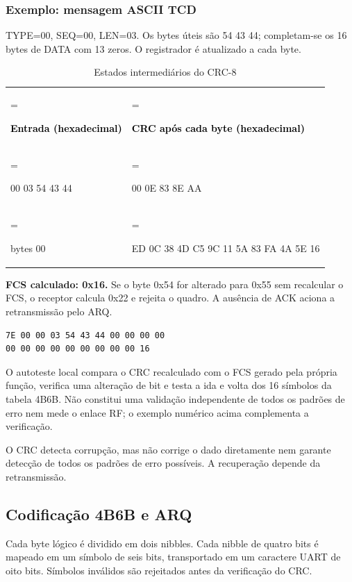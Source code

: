 \subsubsection*{Exemplo: mensagem ASCII TCD}
TYPE=00, SEQ=00, LEN=03. Os bytes úteis são 54 43 44; completam-se os 16 bytes de DATA com 13 zeros. O registrador é atualizado a cada byte.

\begin{table}[H]\centering\small\caption{Estados intermediários do CRC-8}\label{tab:9}
\begin{tabularx}{\linewidth}{>{\hsize=0.7423\hsize\linewidth=\hsize\raggedright\arraybackslash}X>{\hsize=1.2577\hsize\linewidth=\hsize\raggedright\arraybackslash}X}
\rowcolor{tcdtablehead} \textcolor{black}{\textbf{Entrada (hexadecimal)}} & \textcolor{black}{\textbf{CRC após cada byte (hexadecimal)}} \\
00 00 03 54 43 44 & 00 00 0E 83 8E AA \\
13 bytes 00 & ED 0C 38 4D C5 9C 11 5A 83 FA 4A 5E 16 \\
\bottomrule\end{tabularx}\end{table}
\textbf{FCS calculado: 0x16.} Se o byte 0x54 for alterado para 0x55 sem recalcular o FCS, o receptor calcula 0x22 e rejeita o quadro. A ausência de ACK aciona a retransmissão pelo ARQ.

\par\noindent\begin{minipage}{\linewidth}
\begin{lstlisting}
7E 00 00 03 54 43 44 00 00 00 00
00 00 00 00 00 00 00 00 00 16
\end{lstlisting}
\end{minipage}\par
O autoteste local compara o CRC recalculado com o FCS gerado pela própria função, verifica uma alteração de bit e testa a ida e volta dos 16 símbolos da tabela 4B6B. Não constitui uma validação independente de todos os padrões de erro nem mede o enlace RF; o exemplo numérico acima complementa a verificação.

O CRC detecta corrupção, mas não corrige o dado diretamente nem garante detecção de todos os padrões de erro possíveis. A recuperação depende da retransmissão.

\setcounter{subsection}{2}\subsection{Codificação 4B6B e ARQ}
Cada byte lógico é dividido em dois nibbles. Cada nibble de quatro bits é mapeado em um símbolo de seis bits, transportado em um caractere UART de oito bits. Símbolos inválidos são rejeitados antes da verificação do CRC.

